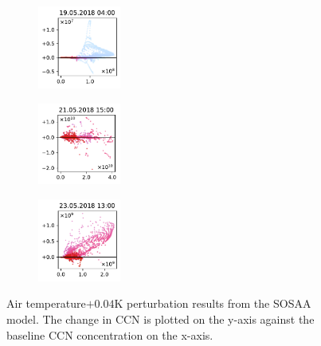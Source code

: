 \begin{figure}[H]
    \begin{subfigure}
        \centering
        \includegraphics[width=0.30\textwidth,valign=t]{evaluation/figures/perturbations/perturbation-19.05.2018:04.00-temperature-add-0.04K.pdf}
    \end{subfigure}
    \begin{subfigure}
        \centering
        \includegraphics[width=0.30\textwidth,valign=t]{evaluation/figures/perturbations/perturbation-21.05.2018:15.00-temperature-add-0.04K.pdf}
    \end{subfigure}
    \begin{subfigure}
        \centering
        \includegraphics[width=0.30\textwidth,valign=t]{evaluation/figures/perturbations/perturbation-23.05.2018:13.00-temperature-add-0.04K.pdf}
    \end{subfigure}

    \caption[Temperature$+ 0.04\text{K}$ perturbation SOSAA results]{Air temperature$+ 0.04\text{K}$ perturbation results from the SOSAA model. The change in CCN is plotted on the y-axis against the baseline CCN concentration on the x-axis.}
    \label{fig:sosaa-perturbation-temperature-add-0.04K}
\end{figure}

